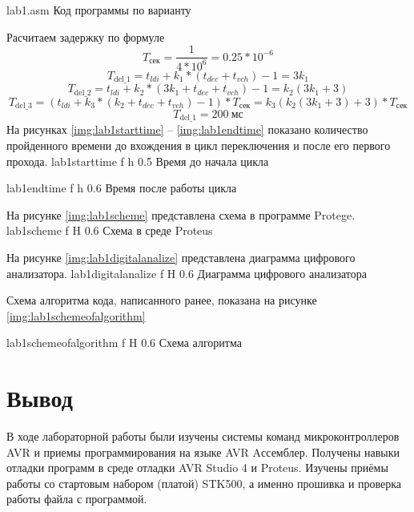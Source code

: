 \documentclass{bmstu}
\begin{document}
    {lab1.asm}
    {Код программы по варианту}
    
Расчитаем задержку по формуле
\[T_{\text{сек}} = \frac{1}{4 * 10^{6}} = 0.25 * 10^{-6}\]
\[T_{\text{del\_1}} = t_{ldi} + k_1 *(t_{dec} + t_{vch}) - 1 = 3k_1\]
\[T_{\text{del\_2}} = t_{ldi} + k_2 *(3k_1 + t_{dec} + t_{vch}) - 1 = k_2(3k_1 + 3)\]
\[T_{\text{del\_3}} = (t_{ldi} + k_3 *(k_2 + t_{dec} + t_{vch}) - 1) * T_{\text{сек}} = k_3(k_2(3k_1 + 3) +3) * T_{\text{сек}}\]
\[T_{\text{del\_1}} = 200~\text{мс}\]
На рисунках \ref{img:lab1starttime} -- \ref{img:lab1endtime} показано количество пройденного времени до вхождения в цикл переключения и после его первого прохода.
    {lab1starttime} %
    {f} %
    {h} %
    {0.5\textwidth} %
    {Время до начала цикла} %

    {lab1endtime} %
    {f} %
    {h} %
    {0.6\textwidth} %
    {Время после работы цикла} %
    
На рисунке \ref{img:lab1scheme} представлена схема в программе Protege.
    {lab1scheme} %
    {f} %
    {H} %
    {0.6\textwidth} %
    {Схема в среде Proteus} %
    
На рисунке \ref{img:lab1digitalanalize} представлена диаграмма цифрового анализатора.
    {lab1digitalanalize} %
    {f} %
    {H} %
    {0.6\textwidth} %
    {Диаграмма цифрового анализатора} %

\newpage
Схема алгоритма кода, написанного ранее, показана на рисунке \ref{img:lab1schemeofalgorithm}

    {lab1schemeofalgorithm} %
    {f} %
    {H} %
    {0.6\textwidth} %
    {Схема алгоритма} %

\section{Вывод}
В ходе лабораторной работы были изучены системы команд микроконтроллеров AVR и
приемы программирования на языке AVR Aссемблер. Получены навыки
отладки программ в среде отладки AVR Studio 4 и Proteus. Изучены приёмы
работы со стартовым набором (платой) STK500, а именно прошивка и проверка работы файла с программой.
\newpage
\end{document}
